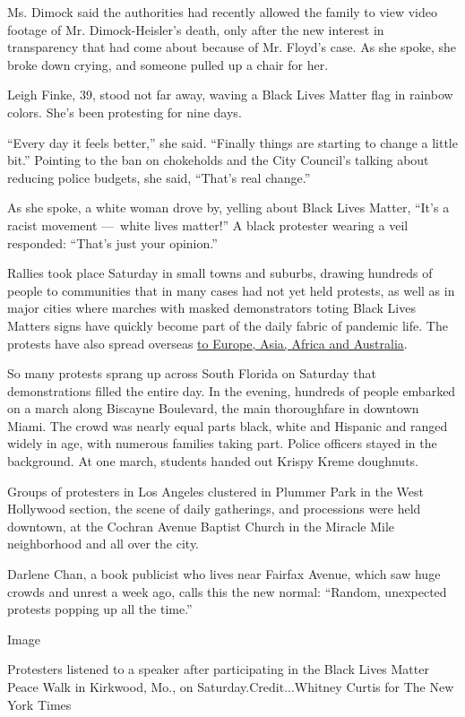 Ms. Dimock said the authorities had recently allowed the family to view
video footage of Mr. Dimock-Heisler's death, only after the new interest
in transparency that had come about because of Mr. Floyd's case. As she
spoke, she broke down crying, and someone pulled up a chair for her.

Leigh Finke, 39, stood not far away, waving a Black Lives Matter flag in
rainbow colors. She's been protesting for nine days.

``Every day it feels better,'' she said. ``Finally things are starting
to change a little bit.'' Pointing to the ban on chokeholds and the City
Council's talking about reducing police budgets, she said, ``That's real
change.''

As she spoke, a white woman drove by, yelling about Black Lives Matter,
``It's a racist movement ---~white lives matter!'' A black protester
wearing a veil responded: ``That's just your opinion.''

Rallies took place Saturday in small towns and suburbs, drawing hundreds
of people to communities that in many cases had not yet held protests,
as well as in major cities where marches with masked demonstrators
toting Black Lives Matters signs have quickly become part of the daily
fabric of pandemic life. The protests have also spread overseas
\href{https://www.nytimes3xbfgragh.onion/2020/06/06/world/george-floyd-global-protests.html}{to
Europe, Asia, Africa and Australia}.

So many protests sprang up across South Florida on Saturday that
demonstrations filled the entire day. In the evening, hundreds of people
embarked on a march along Biscayne Boulevard, the main thoroughfare in
downtown Miami. The crowd was nearly equal parts black, white and
Hispanic and ranged widely in age, with numerous families taking part.
Police officers stayed in the background. At one march, students handed
out Krispy Kreme doughnuts.

Groups of protesters in Los Angeles clustered in Plummer Park in the
West Hollywood section, the scene of daily gatherings, and processions
were held downtown, at the Cochran Avenue Baptist Church in the Miracle
Mile neighborhood and all over the city.

Darlene Chan, a book publicist who lives near Fairfax Avenue, which saw
huge crowds and unrest a week ago, calls this the new normal: ``Random,
unexpected protests popping up all the time.''

Image

Protesters listened to a speaker after participating in the Black Lives
Matter Peace Walk in Kirkwood, Mo., on Saturday.Credit...Whitney Curtis
for The New York Times

